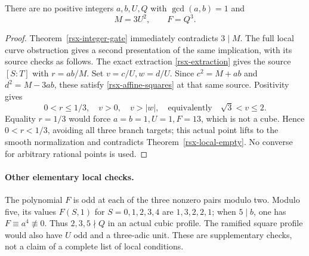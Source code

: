 \begin{corollary}
\label{rsx-square-cube}
There are no positive integers \(a,b,U,Q\) with \(\gcd(a,b)=1\)
and
\[
 M=3U^2,\qquad F=Q^3.
\]
\end{corollary}
\begin{proof}
Theorem~\ref{rsx-integer-gate} immediately contradicts \(3\mid M\).
The full local curve obstruction gives a second presentation
of the same implication, with its source checks as follows.
The exact extraction \eqref{rsx-extraction} gives the source
\([S:T]\) with \(r=ab/M\). Set \(v=c/U,w=d/U\).
Since \(c^2=M+ab\) and \(d^2=M-3ab\), these satisfy
\eqref{rsx-affine-squares} at that same source.
Positivity gives
\[
 0<r\le1/3,\quad v>0,\quad v>|w|,
 \quad\text{equivalently}\quad \sqrt3<v\le2 .
\]
Equality \(r=1/3\) would force \(a=b=1,U=1,F=13\), which
is not a cube. Hence \(0<r<1/3\), avoiding all three branch
targets; this actual point lifts to the smooth normalization
and contradicts Theorem~\ref{rsx-local-empty}.
No converse for arbitrary rational points is used.
\end{proof}

\paragraph{Other elementary local checks.}
The polynomial \(F\) is odd at each of the three nonzero pairs
modulo two. Modulo five, its values \(F(S,1)\) for
\(S=0,1,2,3,4\) are \(1,3,2,2,1\); when \(5\mid b\),
one has \(F\equiv a^4\not\equiv0\).
Thus \(2,3,5\nmid Q\) in an actual cubic profile.
The ramified square profile would also have \(U\) odd and
a three-adic unit. These are supplementary checks, not a
claim of a complete list of local conditions.

